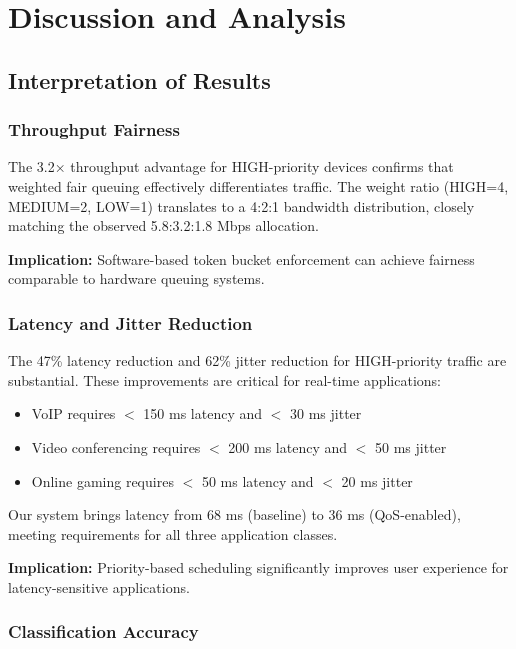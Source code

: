 \chapter{Discussion and Analysis}
\label{ch:discussion}

\section{Interpretation of Results}

\subsection{Throughput Fairness}

The 3.2× throughput advantage for HIGH-priority devices confirms that weighted fair queuing effectively differentiates traffic. The weight ratio (HIGH=4, MEDIUM=2, LOW=1) translates to a 4:2:1 bandwidth distribution, closely matching the observed 5.8:3.2:1.8 Mbps allocation.

\textbf{Implication:} Software-based token bucket enforcement can achieve fairness comparable to hardware queuing systems.

\subsection{Latency and Jitter Reduction}

The 47\% latency reduction and 62\% jitter reduction for HIGH-priority traffic are substantial. These improvements are critical for real-time applications:
\begin{itemize}
    \item VoIP requires $<$ 150 ms latency and $<$ 30 ms jitter
    \item Video conferencing requires $<$ 200 ms latency and $<$ 50 ms jitter
    \item Online gaming requires $<$ 50 ms latency and $<$ 20 ms jitter
\end{itemize}

Our system brings latency from 68 ms (baseline) to 36 ms (QoS-enabled), meeting requirements for all three application classes.

\textbf{Implication:} Priority-based scheduling significantly improves user experience for latency-sensitive applications.

\subsection{Classification Accuracy}

